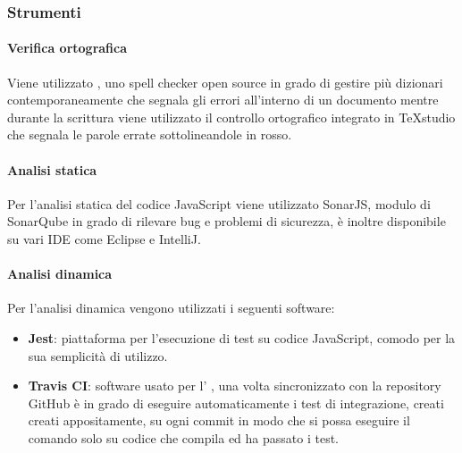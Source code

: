	\subsubsection{Strumenti}
			\paragraph{Verifica ortografica} \Spazio
			Viene utilizzato , uno spell checker open source in grado di gestire più dizionari contemporaneamente che segnala gli errori all'interno di un documento mentre durante la scrittura viene utilizzato il controllo ortografico integrato in TeXstudio che segnala le parole errate sottolineandole in rosso.
			\paragraph{Analisi statica} \Spazio
			Per l'analisi statica del codice JavaScript viene utilizzato SonarJS, modulo di SonarQube in grado di rilevare bug e problemi di sicurezza, è inoltre disponibile su vari IDE come Eclipse e IntelliJ.
			\paragraph{Analisi dinamica} \Spazio
			Per l'analisi dinamica vengono utilizzati i seguenti software:
			\begin{itemize}
				\item  \textbf{Jest}: piattaforma per l'esecuzione di test su codice JavaScript, comodo per la sua semplicità di utilizzo.
				\item \textbf{Travis CI}: software usato per l' , una volta sincronizzato con la repository GitHub è in grado di eseguire automaticamente i test di integrazione, creati creati appositamente, su ogni commit in modo che si possa eseguire il comando  solo su codice che compila ed ha passato i test.
			\end{itemize}
